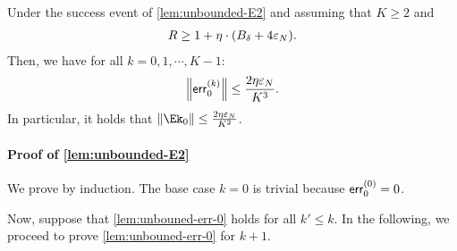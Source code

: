\begin{lemma}\label{lem:unbounded-E0}
Under the success event of \cref{lem:unbounded-E2} and assuming that $K\geq 2$ and
\begin{align*}
    R\geq 1+\eta\cdot {\left(  B_\delta+4\varepsilon_N\right)}.
\end{align*}
Then, we have for all $k=0,1,\cdots,K-1$:
\begin{align}\label{lem:unbouned-err-0}
    \left\|\mathsf{err}^{(k)}_0\right\|\leq \frac{2\eta\varepsilon_N}{K^3}.
\end{align}
In particular, it holds that $\nrm{\Ek_0}\leq \frac{2\eta\epsN}{K^2}$.
\end{lemma}

\paragraph{Proof of \cref{lem:unbounded-E2}}
We prove by induction. The base case $k=0$ is trivial because $\mathsf{err}^{(0)}_0=0$.

Now, suppose that \eqref{lem:unbouned-err-0} holds for all $k'\leq k$. In the following, we proceed to prove \eqref{lem:unbouned-err-0} for $k+1$.

